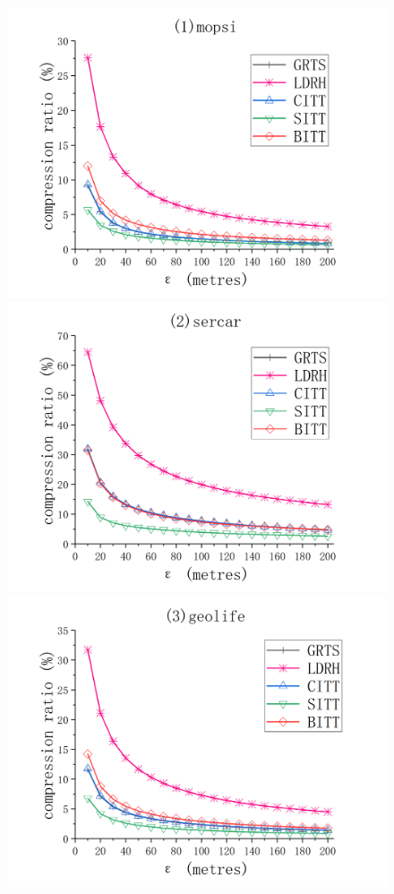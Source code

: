 {\begin{figure}[tb!]
	\centering
	\includegraphics[scale = 0.560]{figures/Fig-mopsi-compression-ratio.png}\hspace{1ex}
	\includegraphics[scale = 0.560]{figures/Fig-sercar-compression-ratio.png}\hspace{1ex}
	\includegraphics[scale = 0.560]{figures/Fig-geolife-compression-ratio.png}\hspace{1ex}

\end{figure}}
